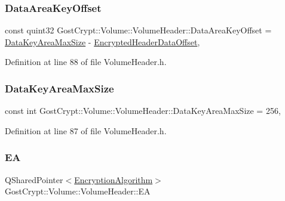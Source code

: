 \subsubsection{\texorpdfstring{Data\+Area\+Key\+Offset}{DataAreaKeyOffset}}
{\footnotesize\ttfamily const quint32 Gost\+Crypt\+::\+Volume\+::\+Volume\+Header\+::\+Data\+Area\+Key\+Offset = \hyperlink{class_gost_crypt_1_1_volume_1_1_volume_header_af27e0bcfd6be57f61941a209a5f1e73f}{Data\+Key\+Area\+Max\+Size} -\/ \hyperlink{class_gost_crypt_1_1_volume_1_1_volume_header_acd2e52603a1ef15adaa66bdc5e1ea794}{Encrypted\+Header\+Data\+Offset}\hspace{0.3cm}{\ttfamily [static]}, {\ttfamily [protected]}}



Definition at line 88 of file Volume\+Header.\+h.

\mbox{\label{class_gost_crypt_1_1_volume_1_1_volume_header_af27e0bcfd6be57f61941a209a5f1e73f}} 
\subsubsection{\texorpdfstring{Data\+Key\+Area\+Max\+Size}{DataKeyAreaMaxSize}}
{\footnotesize\ttfamily const int Gost\+Crypt\+::\+Volume\+::\+Volume\+Header\+::\+Data\+Key\+Area\+Max\+Size = 256\hspace{0.3cm}{\ttfamily [static]}, {\ttfamily [protected]}}



Definition at line 87 of file Volume\+Header.\+h.

\mbox{\label{class_gost_crypt_1_1_volume_1_1_volume_header_af502a8b072d04c9cdc59a6aaed1a5915}} 
\subsubsection{\texorpdfstring{EA}{EA}}
{\footnotesize\ttfamily Q\+Shared\+Pointer$<$\hyperlink{class_gost_crypt_1_1_volume_1_1_encryption_algorithm}{Encryption\+Algorithm}$>$ Gost\+Crypt\+::\+Volume\+::\+Volume\+Header\+::\+EA\hspace{0.3cm}{\ttfamily [protected]}}



